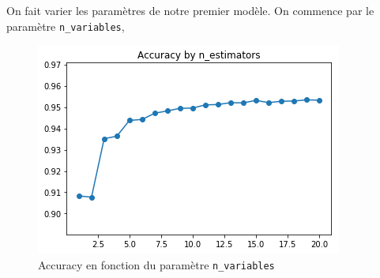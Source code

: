 \documentclass[12pt,a4paper]{article}
\numberwithin{equation}{section}
\begin{document}
	On fait varier les paramètres de notre premier modèle. On commence par le paramètre \texttt{n\_variables}, \\
	
	
	
	\begin{figure}[h]
		\centering
		\includegraphics[width=0.7\linewidth]{img/random_forest_accuracy1}
		\caption{Accuracy en fonction du paramètre \texttt{n\_variables} }
		\label{fig:randomforestaccuracy1}
	\end{figure}
	
	
	
	
	
	
	
\end{document}
